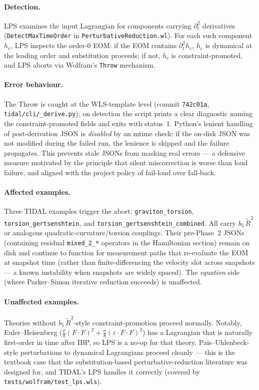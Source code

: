 \paragraph{Detection.}
LPS examines the input Lagrangian for components carrying
$\partial_t^2$ derivatives (\texttt{DetectMaxTimeOrder} in
\texttt{PerturbativeReduction.wl}).  For each such component~$h_c$, LPS
inspects the order-0 EOM: if the EOM contains $\partial_t^2 h_c$, $h_c$
is dynamical at the leading order and substitution proceeds; if not,
$h_c$ is constraint-promoted, and LPS aborts via Wolfram's
\texttt{Throw} mechanism.

\paragraph{Error behaviour.}
The Throw is caught at the WLS-template level (commit \texttt{742c01a},
\texttt{tidal/cli/\_derive.py}); on detection the script prints a
clear diagnostic naming the constraint-promoted fields and exits with
status~1.  Python's lenient handling of post-derivation JSON is
\emph{disabled} by an mtime check: if the on-disk JSON was not modified
during the failed run, the lenience is skipped and the failure
propagates.  This prevents stale JSONs from masking real errors --- a
defensive measure motivated by the principle that silent miscorrection
is worse than loud failure, and aligned with the project policy of
fail-loud over fall-back.

\paragraph{Affected examples.}
Three TIDAL examples trigger the abort:
\texttt{graviton\_torsion}, \texttt{torsion\_gertsenshtein}, and
\texttt{torsion\_gertsenshtein\_combined}.  All carry $b_5\,\tilde{R}^2$
or analogous quadratic-curvature/torsion couplings.  Their
pre-Phase~2 JSONs (containing residual \texttt{mixed\_2\_*} operators in
the Hamiltonian section) remain on disk and continue to function for
measurement paths that re-evaluate the EOM at snapshot time (rather
than finite-differencing the velocity slot across snapshots --- a
known instability when snapshots are widely spaced).  The \emph{equation}
side (where Parker--Simon iterative reduction succeeds) is unaffected.

\paragraph{Unaffected examples.}
Theories without $b_5\,\tilde{R}^2$-style constraint-promotion proceed
normally.  Notably, Euler--Heisenberg
($\frac{\rho}{8}(F\cdot F)^2 + \frac{\sigma}{8}(\varepsilon \cdot F\cdot F)^2$)
has a Lagrangian that is naturally first-order in time after IBP, so
LPS is a no-op for that theory.  Pais--Uhlenbeck-style perturbations
to dynamical Lagrangians proceed cleanly --- this is the textbook case
that the substitution-based perturbative-reduction literature was
designed for, and TIDAL's LPS handles it correctly (covered by
\texttt{tests/wolfram/test\_lps.wls}).

